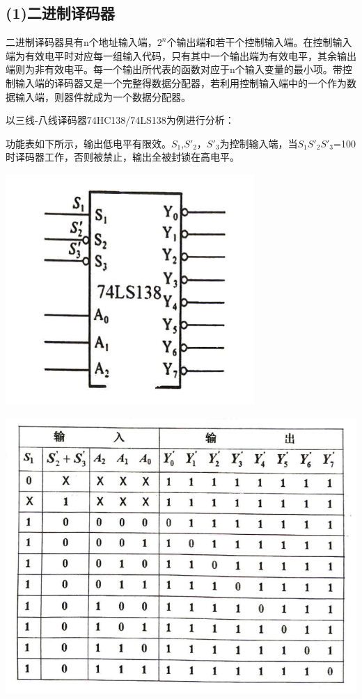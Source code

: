 \documentclass{ctexart}
\begin{document}
    \subsection*{(1)二进制译码器}
    二进制译码器具有n个地址输入端，$2^n$个输出端和若干个控制输入端。在控制输入端为有效电平时对应每一组输入代码，只有其中一个输出端为有效电平，其余输出端则为非有效电平。每一个输出所代表的函数对应于n个输入变量的最小项。带控制输入端的译码器又是一个完整得数据分配器，若利用控制输入端中的一个作为数据输入端，则器件就成为一个数据分配器。

    以三线-八线译码器74HC138/74LS138为例进行分析：
    
    功能表如下所示，输出低电平有限效。$S_1$,$S'_2$，$S'_3$为控制输入端，当$S_1$$S'_2$$S'_3$=100时译码器工作，否则被禁止，输出全被封锁在高电平。
    
    \begin{minipage}[c]{0.5\textwidth}
        \centering
        \includegraphics[width=0.8\linewidth]{2.2.1.png} 
    \end{minipage}
    \begin{minipage}[c]{0.45\textwidth}
        \centering
        \includegraphics[width=1.2\linewidth]{2.2.2.png} 
    \end{minipage}
\end{document}
